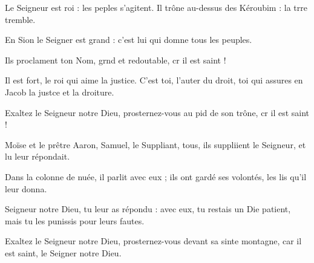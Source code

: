 \item Le Seigneur est roi : les peples s’agitent.\psstar{} Il trône au-dessus des Kéroubim : la trre tremble.
\item En Sion le Seigner est grand :\psstar{} c’est lui qui domne tous les peuples.
\item Ils proclament ton Nom, grnd et redoutable,\psstar{} cr il est saint !
\item Il est fort, le roi qui aime la justice.\pscross{} C’est toi, l’auter du droit,\psstar{} toi qui assures en Jacob la justce et la droiture.
\item Exaltez le Seigneur notre Dieu,\pscross{} prosternez-vous au pid de son trône,\psstar{} cr il est saint !
\item Moïse et le prêtre Aaron, Samuel, le Suppliant,\pscross{} tous, ils suppliient le Seigneur,\psstar{} et lu leur répondait.
\item Dans la colonne de nuée, il parlit avec eux ;\psstar{} ils ont gardé ses volontés, les lis qu’il leur donna.
\item Seigneur notre Dieu, tu leur as répondu :\pscross{} avec eux, tu restais un Die patient,\psstar{} mais tu les punissis pour leurs fautes.
\item Exaltez le Seigneur notre Dieu,\pscross{} prosternez-vous devant sa sinte montagne,\psstar{} car il est saint, le Seigner notre Dieu.